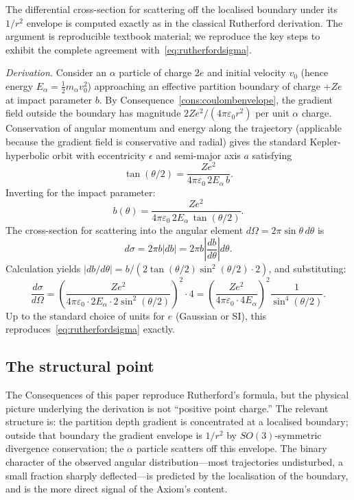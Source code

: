 \documentclass[11pt,twocolumn,a4paper]{article}
\theoremstyle{axiomstyle}
\theoremstyle{conseqstyle}
\theoremstyle{definition}
\theoremstyle{remark}
\begin{document}
The differential cross-section for scattering off the localised boundary under its $1/r^{2}$ envelope is computed exactly as in the classical Rutherford derivation. The argument is reproducible textbook material; we reproduce the key steps to exhibit the complete agreement with~\eqref{eq:rutherfordsigma}.

\emph{Derivation.} Consider an $\alpha$ particle of charge $2e$ and initial velocity $v_{0}$ (hence energy $E_{\alpha}=\tfrac{1}{2}m_{\alpha}v_{0}^{2}$) approaching an effective partition boundary of charge $+Ze$ at impact parameter $b$. By Consequence~\ref{cons:coulombenvelope}, the gradient field outside the boundary has magnitude $2Ze^{2}/(4\pi\varepsilon_{0}r^{2})$ per unit $\alpha$ charge. Conservation of angular momentum and energy along the trajectory (applicable because the gradient field is conservative and radial) gives the standard Kepler-hyperbolic orbit with eccentricity $\epsilon$ and semi-major axis $a$ satisfying
\begin{equation*}
\tan(\theta/2)=\frac{Ze^{2}}{4\pi\varepsilon_{0}\,2E_{\alpha}\,b}.
\end{equation*}
Inverting for the impact parameter:
\begin{equation*}
b(\theta)=\frac{Ze^{2}}{4\pi\varepsilon_{0}\,2E_{\alpha}\,\tan(\theta/2)}.
\end{equation*}
The cross-section for scattering into the angular element $d\Omega=2\pi\sin\theta\,d\theta$ is
\begin{equation*}
d\sigma=2\pi b|db|=2\pi b\left|\frac{db}{d\theta}\right|d\theta.
\end{equation*}
Calculation yields $|db/d\theta|=b/(2\tan(\theta/2)\sin^{2}(\theta/2)\cdot 2)$, and substituting:
\begin{equation*}
\frac{d\sigma}{d\Omega}=\left(\frac{Ze^{2}}{4\pi\varepsilon_{0}\cdot 2E_{\alpha}\cdot 2\sin^{2}(\theta/2)}\right)^{2}\cdot 4 = \left(\frac{Ze^{2}}{4\pi\varepsilon_{0}\cdot 4E_{\alpha}}\right)^{2}\frac{1}{\sin^{4}(\theta/2)}.
\end{equation*}
Up to the standard choice of units for $e$ (Gaussian or SI), this reproduces~\eqref{eq:rutherfordsigma} exactly.

\subsection{The structural point}

The Consequences of this paper reproduce Rutherford's formula, but the physical picture underlying the derivation is not ``positive point charge.'' The relevant structure is: the partition depth gradient is concentrated at a localised boundary; outside that boundary the gradient envelope is $1/r^{2}$ by $SO(3)$-symmetric divergence conservation; the $\alpha$ particle scatters off this envelope. The binary character of the observed angular distribution---most trajectories undisturbed, a small fraction sharply deflected---is predicted by the localisation of the boundary, and is the more direct signal of the Axiom's content.
\end{document}
